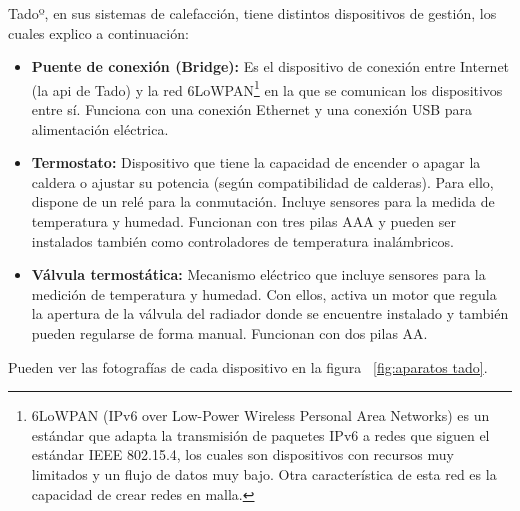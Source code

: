 \documentclass[spanish,12pt, a4paper, twoside]{paper}
\begin{document}
Tadoº, en sus sistemas de calefacción, tiene distintos dispositivos de gestión, los cuales explico a continuación:

\begin{itemize}
\item\textbf{Puente de conexión (Bridge):} Es el dispositivo de conexión entre Internet (la api de Tado) y la red 6LoWPAN\footnote{6LoWPAN (IPv6 over Low-Power Wireless Personal Area Networks) es un estándar que adapta la transmisión de paquetes IPv6 a redes que siguen el estándar IEEE 802.15.4, los cuales son dispositivos con recursos muy limitados y un flujo de datos muy bajo. Otra característica de esta red es la capacidad de crear redes en malla.} en la que se comunican los dispositivos entre sí. Funciona con una conexión Ethernet y una conexión USB para alimentación eléctrica.

\item\textbf{Termostato:} Dispositivo que tiene la capacidad de encender o apagar la caldera o ajustar su potencia (según compatibilidad de calderas). Para ello, dispone de un relé para la conmutación. Incluye sensores para la medida de temperatura y humedad. Funcionan con tres pilas AAA y pueden ser instalados también como controladores de temperatura inalámbricos.

\item\textbf{Válvula termostática:} Mecanismo eléctrico que incluye sensores para la medición de temperatura y humedad. Con ellos, activa un motor que regula la apertura de la válvula del radiador donde se encuentre instalado y también pueden regularse de forma manual. Funcionan con dos pilas AA.
\end{itemize}

Pueden ver las fotografías de cada dispositivo en la figura ~\ref{fig:aparatos tado}.
\newline
\end{document}
